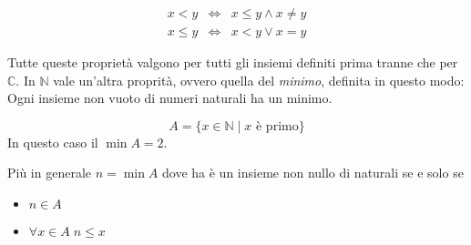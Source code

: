 \begin{observation}
	\begin{equation*}
		\begin{array}{lll}
			x < y    & \Leftrightarrow & x \leq y \wedge x \neq y \\
			x \leq y & \Leftrightarrow & x < y \vee x = y
		\end{array}
	\end{equation*}
\end{observation}

Tutte queste propriet\`a valgono per tutti gli insiemi definiti prima tranne che per
$\mathbb{C}$. In $\mathbb{N}$ vale un'altra proprit\`a, ovvero quella del
\emph{minimo}, definita in questo modo: Ogni insieme non vuoto di numeri naturali
ha un minimo.

\begin{example}
	\begin{equation*}
		A = \{x \in \mathbb{N} \mid \text{$x$ \`e primo}\}
	\end{equation*}
	In questo caso il $\min{A} = 2$.

\end{example}
Pi\`u in generale $n = \min{A}$ dove ha \`e un insieme non nullo di naturali
se e solo se
\begin{itemize}
	\item $n \in A$
	\item $\forall x \in A \; n \leq x$
\end{itemize}